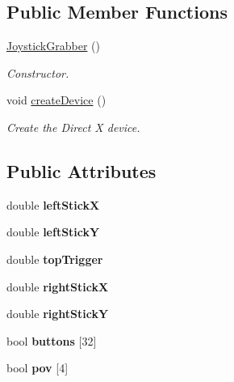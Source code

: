 \subsection*{Public Member Functions}
\begin{DoxyCompactItemize}
\item 
\hyperlink{class_joystick_grabber_ac4ad15976e6599d1c64d67b087f51989}{Joystick\-Grabber} ()
\begin{DoxyCompactList}\small\item\em Constructor. \end{DoxyCompactList}\item 
void \hyperlink{class_joystick_grabber_a699de80499b4bbac5ddfb632f9c7f9b1}{create\-Device} ()
\begin{DoxyCompactList}\small\item\em Create the Direct X device. \end{DoxyCompactList}\end{DoxyCompactItemize}
\subsection*{Public Attributes}
\begin{DoxyCompactItemize}
\item 
\hypertarget{class_joystick_grabber_aa5b0dc1be6c1a5956f4dd35a73d3613f}{double {\bfseries left\-Stick\-X}}\label{class_joystick_grabber_aa5b0dc1be6c1a5956f4dd35a73d3613f}

\item 
\hypertarget{class_joystick_grabber_aebbfc8607fd43a1ec5cf276f61a47b8f}{double {\bfseries left\-Stick\-Y}}\label{class_joystick_grabber_aebbfc8607fd43a1ec5cf276f61a47b8f}

\item 
\hypertarget{class_joystick_grabber_a25d9bc2cbacbba2b787f156d588c6ae2}{double {\bfseries top\-Trigger}}\label{class_joystick_grabber_a25d9bc2cbacbba2b787f156d588c6ae2}

\item 
\hypertarget{class_joystick_grabber_a556ef1a0fc9701f20656ea30563a675d}{double {\bfseries right\-Stick\-X}}\label{class_joystick_grabber_a556ef1a0fc9701f20656ea30563a675d}

\item 
\hypertarget{class_joystick_grabber_a8c1d2647fb27e9eba92b6abcefa4abd9}{double {\bfseries right\-Stick\-Y}}\label{class_joystick_grabber_a8c1d2647fb27e9eba92b6abcefa4abd9}

\item 
\hypertarget{class_joystick_grabber_a3fd1a9704da03136779f38a32dcb1a0d}{bool {\bfseries buttons} \mbox{[}32\mbox{]}}\label{class_joystick_grabber_a3fd1a9704da03136779f38a32dcb1a0d}

\item 
\hypertarget{class_joystick_grabber_a7ef9aeb595e1a619ebd43767c1d0c4bb}{bool {\bfseries pov} \mbox{[}4\mbox{]}}\label{class_joystick_grabber_a7ef9aeb595e1a619ebd43767c1d0c4bb}

\end{DoxyCompactItemize}


